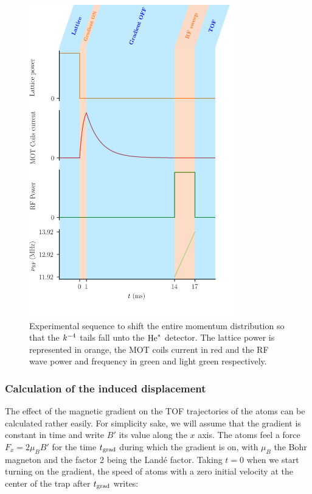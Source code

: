 \begin{figure}
    \centering
    \includegraphics[width=0.8\textwidth]{Fig/Chapter5/displacement_sequence.png}
    \caption{Experimental sequence to shift the entire momentum distribution so that the $k^{-4}$ tails fall unto the $\mathrm{He}^*$ detector. The lattice power is represented in orange, the MOT coils current in red and the RF wave power and frequency in green and light green respectively.}
    \label{fig:displacement_sequence}
\end{figure}

\subsubsection{Calculation of the induced displacement}

The effect of the magnetic gradient on the TOF trajectories of the atoms can be calculated rather easily. For simplicity sake, we will assume that the gradient is constant in time and write $B'$ its value along the $x$ axis. The atoms feel a force $F_x=2 \mu_B B'$ for the time $t_{\rm{grad}}$ during which the gradient is on, with $\mu_B$ the Bohr magneton and the factor 2 being the Landé factor. Taking $t=0$ when we start turning on the gradient, the speed of atoms with a zero initial velocity at the center of the trap after $t_{\rm{grad}}$ writes:

